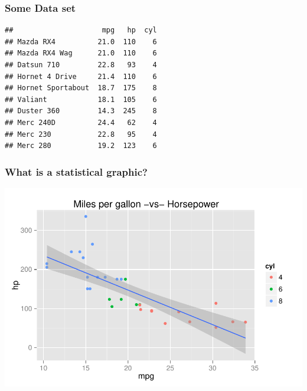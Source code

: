 \documentclass[12pt]{beamer}\usepackage[]{graphicx}\usepackage[]{color}
\makeatletter
\newenvironment{kframe}{%
 \def\at@end@of@kframe{}%
 \ifinner\ifhmode%
  \def\at@end@of@kframe{\end{minipage}}%
  \begin{minipage}{\columnwidth}%
 \fi\fi%
 \def\FrameCommand##1{\hskip\@totalleftmargin \hskip-\fboxsep
 \colorbox{shadecolor}{##1}\hskip-\fboxsep
     \hskip-\linewidth \hskip-\@totalleftmargin \hskip\columnwidth}%
 \MakeFramed {\advance\hsize-\width
   \@totalleftmargin\z@ \linewidth\hsize
   \@setminipage}}%
 {\par\unskip\endMakeFramed%
 \at@end@of@kframe}
\newenvironment{knitrout}{}{} %
\makeatother
\begin{document}

\begin{frame}[fragile]
\frametitle{Some Data set}
\begin{knitrout}\footnotesize
{}\color{fgcolor}\begin{kframe}
\begin{verbatim}
##                     mpg   hp  cyl
## Mazda RX4          21.0  110    6
## Mazda RX4 Wag      21.0  110    6
## Datsun 710         22.8   93    4
## Hornet 4 Drive     21.4  110    6
## Hornet Sportabout  18.7  175    8
## Valiant            18.1  105    6
## Duster 360         14.3  245    8
## Merc 240D          24.4   62    4
## Merc 230           22.8   95    4
## Merc 280           19.2  123    6
\end{verbatim}
\end{kframe}
\end{knitrout}
\end{frame}


\begin{frame}[fragile]
\frametitle{What is a statistical graphic?}
\begin{knitrout}\scriptsize
{}\color{fgcolor}

{\centering \includegraphics[width=.95\linewidth,height=.65\linewidth]{figure/unnamed-chunk-6-1} 

}



\end{knitrout}
\end{frame}
\end{document}
